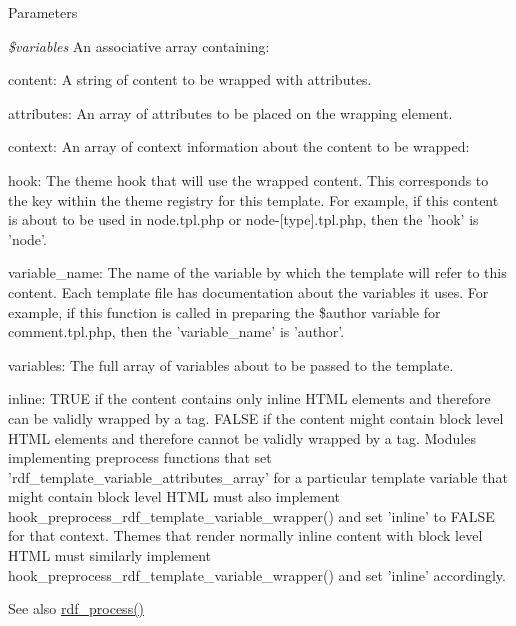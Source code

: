 \begin{DoxyParams}{Parameters}
\item[{\em \$variables}]An associative array containing:
\begin{DoxyItemize}
\item content: A string of content to be wrapped with attributes.
\item attributes: An array of attributes to be placed on the wrapping element.
\item context: An array of context information about the content to be wrapped:
\begin{DoxyItemize}
\item hook: The theme hook that will use the wrapped content. This corresponds to the key within the theme registry for this template. For example, if this content is about to be used in node.tpl.php or node-\/\mbox{[}type\mbox{]}.tpl.php, then the 'hook' is 'node'.
\item variable\_\-name: The name of the variable by which the template will refer to this content. Each template file has documentation about the variables it uses. For example, if this function is called in preparing the \$author variable for comment.tpl.php, then the 'variable\_\-name' is 'author'.
\item variables: The full array of variables about to be passed to the template.
\end{DoxyItemize}
\item inline: TRUE if the content contains only inline HTML elements and therefore can be validly wrapped by a  tag. FALSE if the content might contain block level HTML elements and therefore cannot be validly wrapped by a  tag. Modules implementing preprocess functions that set 'rdf\_\-template\_\-variable\_\-attributes\_\-array' for a particular template variable that might contain block level HTML must also implement hook\_\-preprocess\_\-rdf\_\-template\_\-variable\_\-wrapper() and set 'inline' to FALSE for that context. Themes that render normally inline content with block level HTML must similarly implement hook\_\-preprocess\_\-rdf\_\-template\_\-variable\_\-wrapper() and set 'inline' accordingly.
\end{DoxyItemize}\end{DoxyParams}
\begin{DoxySeeAlso}{See also}
 \hyperlink{rdf_8module_a33cf33f554fea60776a23c543557ff7b}{rdf\_\-process()} 
\end{DoxySeeAlso}
